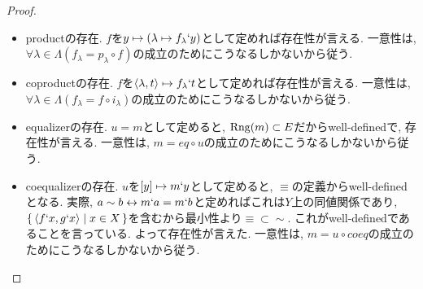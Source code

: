 \documentclass[a4paper, twoside]{bxjsarticle}
\theoremstyle{definition}
\begin{document}
        \begin{proof}
            \begin{itemize}
                 \item productの存在. $f$を$y \mapsto (\lambda \mapsto f_\lambda`y)$として定めれば存在性が言える. 一意性は, $\forall \lambda \in \Lambda (f_\lambda = p_\lambda \circ f)$の成立のためにこうなるしかないから従う.
                \item coproductの存在. $f$を$\langle \lambda, t \rangle \mapsto f_\lambda`t$として定めれば存在性が言える. 一意性は, $\forall \lambda \in \Lambda (f_\lambda = f \circ i_\lambda)$の成立のためにこうなるしかないから従う.
                \item equalizerの存在. $u=m$として定めると, ${\rm Rng}(m)\subset E$だからwell-definedで, 存在性が言える. 一意性は, $m = eq \circ u$の成立のためにこうなるしかないから従う.
                \item coequalizerの存在. $u$を$[y] \mapsto m`y$として定めると, $\equiv$の定義からwell-definedとなる. 実際, $a \sim b \leftrightarrow m`a = m`b$と定めればこれは$Y$上の同値関係であり, $\set{\langle f`x, g`x \rangle|x\in X}$を含むから最小性より$\equiv \subset \sim$. これがwell-definedであることを言っている. よって存在性が言えた. 一意性は, $m = u \circ coeq$の成立のためにこうなるしかないから従う.
            \end{itemize}
        \end{proof}
        
\end{document}
